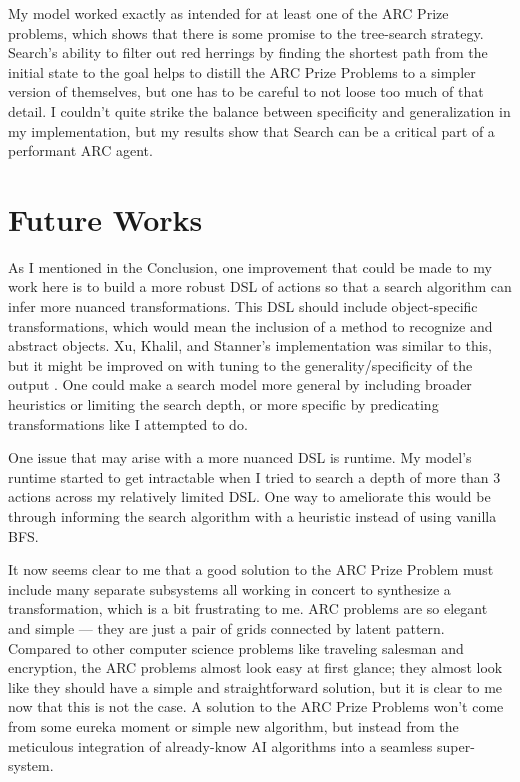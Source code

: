 \documentclass[letterpaper]{article} %
\begin{document}
\bigskip

My model worked exactly as intended for at least one of the ARC Prize problems, which shows that there is some promise to the tree-search strategy. Search's ability to filter out red herrings by finding the shortest path from the initial state to the goal helps to distill the ARC Prize Problems to a simpler version of themselves, but one has to be careful to not loose too much of that detail. I couldn't quite strike the balance between specificity and generalization in my implementation, but my results show that Search can be a critical part of a performant ARC agent.

\section{Future Works}
As I mentioned in the Conclusion, one improvement that could be made to my work here is to build a more robust DSL of actions so that a search algorithm can infer more nuanced transformations. This DSL should include object-specific transformations, which would mean the inclusion of a method to recognize and abstract objects. Xu, Khalil, and Stanner's implementation was similar to this, but it might be improved on with tuning to the generality/specificity of the output \cite{Xu_Khalil_Sanner_2023}. One could make a search model more general by including broader heuristics or limiting the search depth, or more specific by predicating transformations like I attempted to do. 

\bigskip

One issue that may arise with a more nuanced DSL is runtime. My model's runtime started to get intractable when I tried to search a depth of more than 3 actions across my relatively limited DSL. One way to ameliorate this would be through informing the search algorithm with a heuristic instead of using vanilla BFS.

\bigskip

It now seems clear to me that a good solution to the ARC Prize Problem must include many separate subsystems all working in concert to synthesize a transformation, which is a bit frustrating to me. ARC problems are so elegant and simple --- they are just a pair of grids connected by latent pattern. Compared to other computer science problems like traveling salesman and encryption, the ARC problems almost look easy at first glance; they almost look like they should have a simple and straightforward solution, but it is clear to me now that this is not the case. A solution to the ARC Prize Problems won't come from some eureka moment or simple new algorithm, but instead from the meticulous integration of already-know AI algorithms into a seamless super-system.


\end{document}
